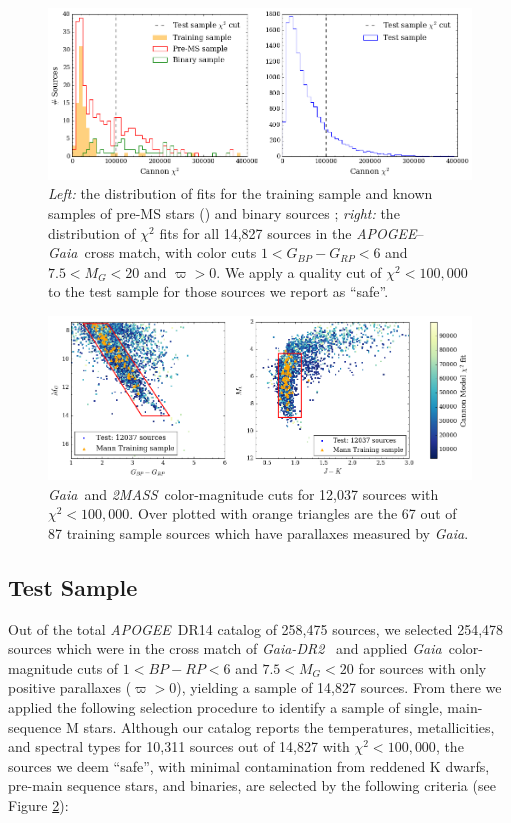 \documentclass[twocolumn]{aastex62}
\newcommand{\apogee}{\textsl{APOGEE}}
\newcommand{\gaia}{\textsl{Gaia}}
\newcommand{\drtwo}{\textsl{Gaia-DR2}}
\newcommand{\zmass}{\textsl{2MASS}}
\begin{document}
\begin{figure}
	\includegraphics[width=\linewidth]{figures/cannon_chi_dist.png}
	\caption{\textit{Left:} the distribution of fits for the training sample and known samples of pre-MS stars (\citealt{Cottaar:2014}) and binary sources \citep{ElBadry:2018,Skinner:2018}; \textit{right:} the distribution of $\chi^2$ fits for all 14,827 sources in the \apogee --\gaia\ cross match, with color cuts $1<G_{BP}-G_{RP}<6$ and $7.5<M_{G}<20$ and $\varpi>0$. We apply a quality cut of $\chi^2 < 100,000$ to the test sample for those sources we report as ``safe''.}
	\label{fig:chi_dist}
\end{figure}

\begin{figure}
	\includegraphics[width=\linewidth]{figures/cmd_selection.png}
	\caption{\gaia\ and \zmass\ color-magnitude cuts for 12,037 sources with $\chi^2<100,000$. Over plotted with orange triangles are the 67 out of 87 training sample sources which have parallaxes measured by \gaia.}
	\label{fig:cmd_selection}
\end{figure}

\subsection{Test Sample \label{subsec:test_selection}} 

Out of the total \apogee\ DR14 catalog of 258,475 sources, we selected 254,478 sources which were in the cross match of \drtwo\ \citep{Brown:2018} and applied \gaia\ color-magnitude cuts of $1<BP-RP<6$ and $7.5<M_G<20$ for sources with only positive parallaxes ($\varpi>0$), yielding a sample of 14,827 sources. From there we applied the following selection procedure to identify a sample of single, main-sequence M stars. Although our catalog reports the temperatures, metallicities, and spectral types for 10,311 sources out of 14,827 with $\chi^2<100,000$, the sources we deem ``safe'', with minimal contamination from reddened K dwarfs, pre-main sequence stars, and binaries, are selected by the following criteria (see Figure \ref{fig:cmd_selection}):
\end{document}
